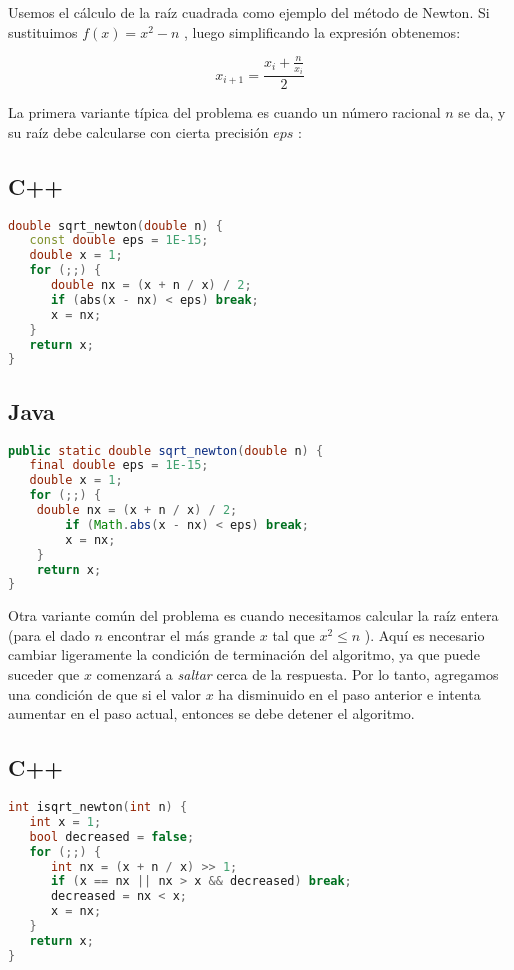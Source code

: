 Usemos el cálculo de la raíz cuadrada como ejemplo del método de Newton. Si sustituimos $f(x) = x^2 - n$ , luego simplificando la expresión obtenemos: 

$$ x_{i+1} = \frac{x_i + \frac{n}{x_i}}{2} $$ 

La primera variante típica del problema es cuando un número racional $n$ se da, y su raíz debe calcularse con cierta precisión $eps$ :

\subsection{C++}
\begin{lstlisting}[language=C++]
double sqrt_newton(double n) {
   const double eps = 1E-15;
   double x = 1;
   for (;;) {
      double nx = (x + n / x) / 2;
      if (abs(x - nx) < eps) break;
      x = nx;
   }
   return x;
}
\end{lstlisting}

\subsection{Java}
\begin{lstlisting}[language=Java]
public static double sqrt_newton(double n) {
   final double eps = 1E-15;
   double x = 1;
   for (;;) {
	double nx = (x + n / x) / 2;
		if (Math.abs(x - nx) < eps) break;
		x = nx;
	}
	return x;
}
\end{lstlisting}

Otra variante común del problema es cuando necesitamos calcular la raíz entera (para el dado $n$  encontrar el más grande $x$ tal que  $x^2 \le n$ ). Aquí es
necesario cambiar ligeramente la condición de terminación del algoritmo, ya que puede suceder que $x$ comenzará a \emph{saltar} cerca de la respuesta. Por lo tanto, agregamos una condición de que si el valor $x$ ha disminuido en el paso anterior e intenta aumentar en el paso actual, entonces se debe
detener el algoritmo.

\subsection{C++}
\begin{lstlisting}[language=C++]
int isqrt_newton(int n) {
   int x = 1;
   bool decreased = false;
   for (;;) {
      int nx = (x + n / x) >> 1;
      if (x == nx || nx > x && decreased) break;
      decreased = nx < x;
      x = nx;
   }
   return x;
}
\end{lstlisting}


